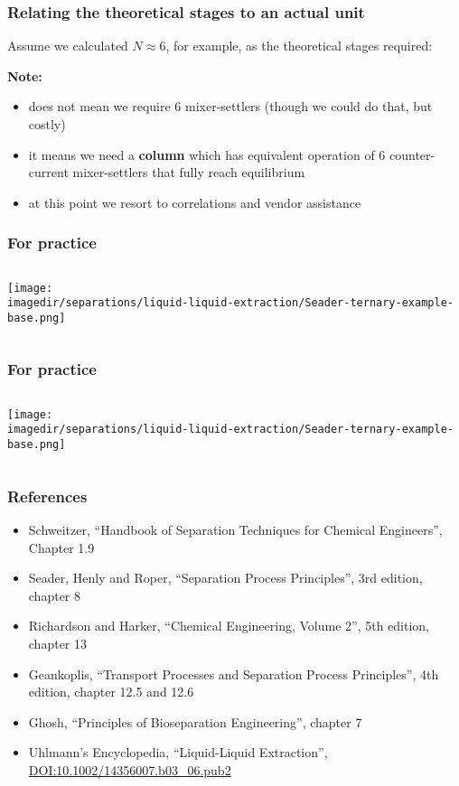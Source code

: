 \begin{frame}\frametitle{Relating the theoretical stages to an actual unit}
 	Assume we calculated $N\approx 6$, for example, as the theoretical stages required:

	\vspace{12pt}
	\textbf{Note:}
	\begin{itemize}
		\item	does not mean we require 6 mixer-settlers (though we could do that, but costly)
		\item	it means we need a \textbf{column} which has equivalent operation of 6 counter-current mixer-settlers that fully reach equilibrium
		\item	at this point we resort to correlations and vendor assistance
	\end{itemize}
\end{frame}

\begin{frame}\frametitle{For practice}
	\begin{columns}[t]
			\begin{center}
				\texttt{[image: \\imagedir/separations/liquid-liquid-extraction/Seader-ternary-example-base.png]}
			\end{center}			
	\end{columns}
\end{frame}

\begin{frame}\frametitle{For practice}
	\begin{columns}[t]
			\begin{center}
				\texttt{[image: \\imagedir/separations/liquid-liquid-extraction/Seader-ternary-example-base.png]}
			\end{center}			
	\end{columns}
\end{frame}

\begin{frame}\frametitle{References}
	\begin{itemize}
		\item	Schweitzer, ``Handbook of Separation Techniques for Chemical Engineers'', Chapter 1.9
		\item	Seader, Henly and Roper, ``Separation Process Principles'', 3rd edition, chapter 8
		\item	Richardson and Harker, ``Chemical Engineering, Volume 2'', 5th edition, chapter 13
		\item	Geankoplis, ``Transport Processes and Separation Process Principles'', 4th edition, chapter 12.5 and 12.6
		\item	Ghosh, ``Principles of Bioseparation Engineering'', chapter 7
		\item	Uhlmann's Encyclopedia, ``Liquid-Liquid Extraction'',  \href{http://dx.doi.org/10.1002/14356007.b03\_06.pub2}{DOI:10.1002/14356007.b03\_06.pub2}
	\end{itemize}
\end{frame}


